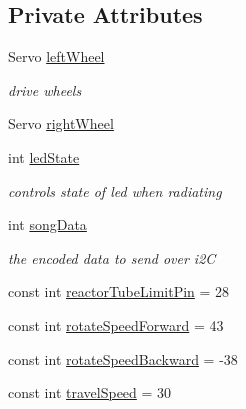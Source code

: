 \subsection*{Private Attributes}
\begin{DoxyCompactItemize}
\item 
Servo \hyperlink{classRobot_af357e059c6c07190c92c6c9a00e2b8af}{left\-Wheel}
\begin{DoxyCompactList}\small\item\em drive wheels \end{DoxyCompactList}\item 
Servo \hyperlink{classRobot_a3b2dd5b89e44fd3a7ba239554fb5b8a7}{right\-Wheel}
\item 
int \hyperlink{classRobot_a3c7308c71db125a8840f9c82b5fec9ca}{led\-State}
\begin{DoxyCompactList}\small\item\em controls state of led when radiating \end{DoxyCompactList}\item 
int \hyperlink{classRobot_a7818916adfa736ab4cb21011fe302cdb}{song\-Data}
\begin{DoxyCompactList}\small\item\em the encoded data to send over i2\-C \end{DoxyCompactList}\item 
const int \hyperlink{classRobot_a351d754436c8f569432ef7a06641f98a}{reactor\-Tube\-Limit\-Pin} = 28
\item 
const int \hyperlink{classRobot_a9cf41f47520ed8f848da5c6e2d0ff7b0}{rotate\-Speed\-Forward} = 43
\item 
const int \hyperlink{classRobot_a04bc29522467c056ae6698017f32f048}{rotate\-Speed\-Backward} = -\/38
\item 
const int \hyperlink{classRobot_a87ec942d7d53b1a4b1c46422f6a134eb}{travel\-Speed} = 30
\end{DoxyCompactItemize}
